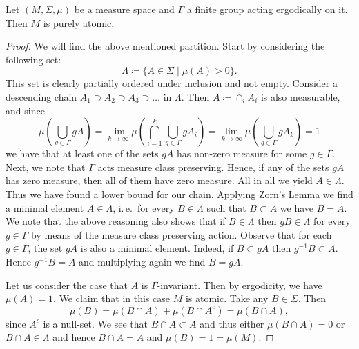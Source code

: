 \begin{lemma}
  \label{lem:ergodic-atomic}
  Let \((M, \Sigma, \mu)\) be a measure space and \(\Gamma\) a finite group acting ergodically on it. Then \(M\) is purely atomic.
\end{lemma}

\begin{proof}
  We will find the above mentioned partition. Start by considering the following set:
  \[
    \Lambda \coloneqq \{A \in \Sigma \mid \mu(A) > 0\}.
  \]
  This set is clearly partially ordered under inclusion and not empty. Consider a descending chain \(A_1 \supset A_2 \supset A_3 \supset \dots\) in \(\Lambda\). Then \(A \coloneqq \cap_i A_i\) is also measurable, and since
  \[
    \mu\left(\bigcup_{g \in \Gamma} gA\right) = \lim_{k \to \infty} \mu\left( \bigcap_{i=1}^k \bigcup_{g\in \Gamma} gA_i\right) = \lim_{k \to \infty} \mu\left(\bigcup_{g \in \Gamma} gA_k\right) = 1
  \]
  we have that at least one of the sets \(gA\) has non-zero measure for some \(g \in \Gamma\). Next, we note that \(\Gamma\) acts measure class preserving. Hence, if any of the sets \(gA\) has zero measure, then all of them have zero measure. All in all we yield \(A \in \Lambda\). Thus we have found a lower bound for our chain. Applying Zorn's Lemma we find a minimal element \(A \in \Lambda\), i.\,e.\ for every \(B \in \Lambda\) such that \(B \subset A\) we have \(B = A\). We note that the above reasoning also shows that if \(B \in \Lambda\) then \(gB \in \Lambda\) for every \(g \in \Gamma\) by means of the measure class preserving action. Observe that for each \(g \in \Gamma\), the set \(gA\) is also a minimal element. Indeed, if \(B \subset gA\) then \(g^{-1} B \subset A\). Hence \(g^{-1}B = A\) and multiplying again we find \(B = gA\).

  Let us consider the case that \(A\) is \(\Gamma\)-invariant. Then by ergodicity, we have \(\mu(A) = 1\). We claim that in this case \(M\) is atomic. Take any \(B \in \Sigma\).
  Then
  \[
    \mu(B) = \mu(B \cap A) + \mu(B \cap A^c) = \mu(B \cap A),
  \]
  since \(A^c\) is a null-set. We see that \(B \cap A \subset A\) and thus either \(\mu(B \cap A) = 0\) or \(B  \cap A \in \Lambda\) and hence \(B \cap A = A\) and \(\mu(B) = 1 = \mu(M)\).


\end{proof}
